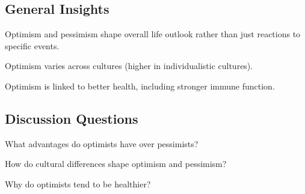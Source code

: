 \subsection{General Insights}  
\begin{coloredlist}  
    \item Optimism and pessimism shape overall life outlook rather than just reactions to specific events.  
    \item Optimism varies across cultures (higher in individualistic cultures).  
    \item Optimism is linked to better health, including stronger immune function.  
\end{coloredlist}  

\subsection{Discussion Questions}  
\begin{coloredlist}  
    \item What advantages do optimists have over pessimists?  
    \item How do cultural differences shape optimism and pessimism?  
    \item Why do optimists tend to be healthier?  
\end{coloredlist}  
